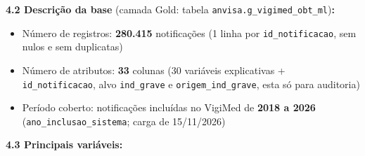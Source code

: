 \documentclass[11pt, a4paper]{article}
\newcommand{\var}[1]{\texttt{#1}}
\begin{document}
\vspace{6pt}
\textbf{4.2 Descrição da base} {\small (camada Gold: tabela \var{anvisa.g\_vigimed\_obt\_ml})}\textbf{:}
\begin{itemize}
    \item Número de registros: \textbf{280.415} notificações (1 linha por \var{id\_notificacao}, sem nulos e sem duplicatas)
    \item Número de atributos: \textbf{33} colunas (30 variáveis explicativas + \var{id\_notificacao}, alvo \var{ind\_grave} e \var{origem\_ind\_grave}, esta só para auditoria)
    \item Período coberto: notificações incluídas no VigiMed de \textbf{2018 a 2026} (\var{ano\_inclusao\_sistema}; carga de 15/11/2026)
\end{itemize}

\textbf{4.3 Principais variáveis:}
\end{document}
